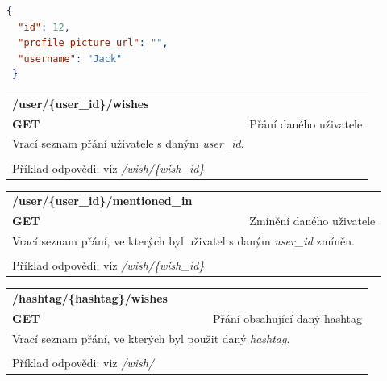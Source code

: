 \documentclass[thesis=B,czech]{FITthesis}[2012/06/26]
\begin{document}
\begin{lstlisting}[language=json,firstnumber=1]
 {
  "id": 12,
  "profile_picture_url": "",
  "username": "Jack"
 }
\end{lstlisting} 

\begin{table}[h]
\begin{tabular}{llllr}
\rowcolor[HTML]{EFEFEF}
\large \textbf{/user/\{user\_id\}/wishes}        &         &                 &        & \multicolumn{1}{l}{}                \\
\rowcolor[HTML]{EFEFEF}
\textbf{GET}          &         &                 &        & Přání daného uživatele                        \\
\multicolumn{5}{l}{\parbox[t]{12.8cm}{Vrací seznam přání uživatele s daným \textit{user\_id}. }  } \\  
 & & & & \\
 Příklad odpovědi: viz \textit{/wish/\{wish\_id\}}
\end{tabular}
\end{table}

\begin{table}[h]
\begin{tabular}{llllr}
\rowcolor[HTML]{EFEFEF}
\large \textbf{/user/\{user\_id\}/mentioned\_in}        &         &                 &        & \multicolumn{1}{l}{}                \\
\rowcolor[HTML]{EFEFEF}
\textbf{GET}          &         &                 &        & Zmínění daného uživatele                        \\
\multicolumn{5}{l}{\parbox[t]{12.8cm}{Vrací seznam přání, ve kterých byl uživatel s daným \textit{user\_id} zmíněn. }  } \\  
 & & & & \\
 Příklad odpovědi: viz \textit{/wish/\{wish\_id\}}
\end{tabular}
\end{table}


\begin{table}[h]
\begin{tabular}{llllr}
\rowcolor[HTML]{EFEFEF}
\large \textbf{/hashtag/\{hashtag\}/wishes}        &         &                 &        & \multicolumn{1}{l}{}                \\
\rowcolor[HTML]{EFEFEF}
\textbf{GET}          &         &                 &        & Přání obsahující daný hashtag                       \\
\multicolumn{5}{l}{\parbox[t]{12.8cm}{Vrací seznam přání, ve kterých byl použit daný \textit{hashtag}. }  } \\  
 & & & & \\
 Příklad odpovědi: viz \textit{/wish/}
\end{tabular}
\end{table}
\end{document}
